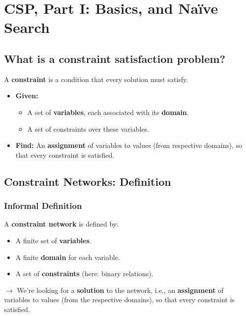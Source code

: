 \documentclass[conference, a4paper]{styles/acmsiggraph}
\begin{document}
\newpage

\section{CSP, Part I: Basics, and Na{\"i}ve Search}

    \subsection{What is a constraint satisfaction problem?}
        A \textbf{constraint} is a condition that every solution must satisfy.
        \begin{itemize}
            \item \textbf{Given:}
                \begin{itemize}
                    \item A set of \textbf{variables}, each associated with its \textbf{domain}.
                    \item A set of constraints over these variables.
                \end{itemize}
            \item \textbf{Find:} An \textbf{assignment} of variables to values (from respective domains), so that every constraint is satisfied.
        \end{itemize}
    
    
    \subsection{Constraint Networks: Definition}
        \subsubsection{Informal Definition}
            A \textbf{constraint network} is defined by:
            \begin{itemize}
                \item A finite set of \textbf{variables}.
                \item A finite \textbf{domain} for each variable.
                \item A set of \textbf{constraints} (here: binary relations).
            \end{itemize}
            
            $\rightarrow$ We're looking for a \textbf{solution} to the network, i.e., an \textbf{assignment} of variables to values (from the respective domains), so that every constraint is satisfied.
            
\end{document}
